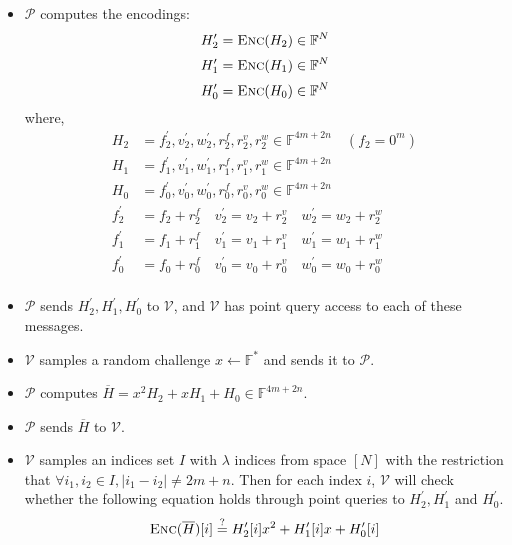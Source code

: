 \begin{itemize}
    \item $\mathcal{P}$ computes the encodings:
\begin{equation*}
    H_2^\prime = \textsc{Enc}(H_2) \in \mathbb{F}^{N}
\end{equation*}
\begin{equation*}
    H_1^\prime = \textsc{Enc}(H_1) \in \mathbb{F}^{N}
\end{equation*}
\begin{equation*}
    H_0^\prime = \textsc{Enc}(H_0) \in \mathbb{F}^{N}
\end{equation*}
where, 
\begin{align*}
    H_2 &= f_2^\prime, v_2^\prime, w_2^\prime, r^f_2, r^v_2, r^w_2 
    \in \mathbb{F}^{4m+2n} \quad (f_2 = 0^m) \\
    H_1 &= f_1^\prime, v_1^\prime, w_1^\prime, r^f_1, r^v_1, r^w_1 
    \in \mathbb{F}^{4m+2n} \\
    H_0 &= f_0^\prime, v_0^\prime, w_0^\prime, r^f_0, r^v_0, r^w_0 
    \in \mathbb{F}^{4m+2n} \\
    f_2^\prime &= f_2+r^f_2 \quad
    v_2^\prime =  v_2+r^v_2 \quad
    w_2^\prime =  w_2+r^w_2 \\
    f_1^\prime &= f_1+r^f_1 \quad
    v_1^\prime =  v_1+r^v_1 \quad
    w_1^\prime =  w_1+r^w_1 \\
    f_0^\prime &= f_0+r^f_0 \quad
    v_0^\prime =  v_0+r^v_0 \quad
    w_0^\prime =  w_0+r^w_0 \\
\end{align*}

    \item $\mathcal{P}$ sends $H_2^\prime, H_1^\prime, H_0^\prime$ to $\mathcal{V}$, and $\mathcal{V}$ has point query access to each of these messages.
    
    \item $\mathcal{V}$ samples a random challenge $x \leftarrow \mathbb{F}^*$ and sends it to $\mathcal{P}$.
    
    \item $\mathcal{P}$ computes $\overline{H} = x^2H_2 + xH_1 + H_0 \in \mathbb{F}^{4m+2n}$.

    \item $\mathcal{P}$ sends $\overline{H}$ to $\mathcal{V}$.

    \item $\mathcal{V}$ samples an indices set $I$ with $\lambda$ indices from space $[N]$ with the restriction that $\forall i_1, i_2 \in I, |i_1 - i_2| \neq 2m+n$. Then for each index $i$, $\mathcal{V}$ will check whether the following equation holds through point queries to $H_2^\prime, H_1^\prime$ and $H_0^\prime$.
\begin{equation}
\label{eq:lwe5}
    \textsc{Enc}(\overline{H})[i] 
    \stackrel{?}{=} 
    H_2^\prime[i] x^2 + H_1^\prime[i] x + H_0^\prime[i]
\end{equation}




\end{itemize}
